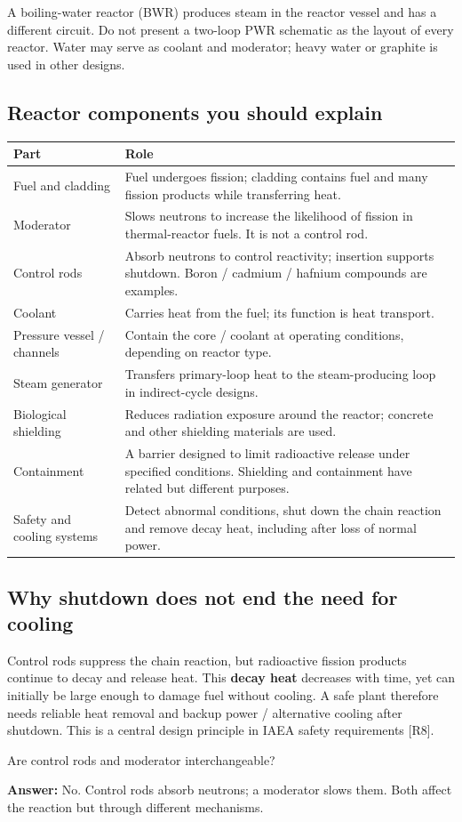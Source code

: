 \documentclass[11pt,a4paper]{article}
\newcommand{\checkq}[2]{\begin{tcolorbox}[breakable=false,colback=pale,colframe=teal,coltitle=white,title={Check your understanding}]#1\par\textbf{Answer:} #2\end{tcolorbox}}
\begin{document}
A boiling-water reactor (BWR) produces steam in the reactor vessel and has a different circuit. Do not present a two-loop PWR schematic as the layout of every reactor. Water may serve as coolant and moderator; heavy water or graphite is used in other designs.

\subsection{Reactor components you should explain}
\begin{center}\small
\begin{tabularx}{\textwidth}{L{3.4cm}Y}
\toprule\textbf{Part} & \textbf{Role}\\\midrule
Fuel and cladding & Fuel undergoes fission; cladding contains fuel and many fission products while transferring heat.\\
Moderator & Slows neutrons to increase the likelihood of fission in thermal-reactor fuels. It is not a control rod.\\
Control rods & Absorb neutrons to control reactivity; insertion supports shutdown. Boron / cadmium / hafnium compounds are examples.\\
Coolant & Carries heat from the fuel; its function is heat transport.\\
Pressure vessel / channels & Contain the core / coolant at operating conditions, depending on reactor type.\\
Steam generator & Transfers primary-loop heat to the steam-producing loop in indirect-cycle designs.\\
Biological shielding & Reduces radiation exposure around the reactor; concrete and other shielding materials are used.\\
Containment & A barrier designed to limit radioactive release under specified conditions. Shielding and containment have related but different purposes.\\
Safety and cooling systems & Detect abnormal conditions, shut down the chain reaction and remove decay heat, including after loss of normal power.\\\bottomrule
\end{tabularx}\end{center}

\subsection{Why shutdown does not end the need for cooling}
Control rods suppress the chain reaction, but radioactive fission products continue to decay and release heat. This \textbf{decay heat} decreases with time, yet can initially be large enough to damage fuel without cooling. A safe plant therefore needs reliable heat removal and backup power / alternative cooling after shutdown. This is a central design principle in IAEA safety requirements [R8].
\checkq{Are control rods and moderator interchangeable?}{No. Control rods absorb neutrons; a moderator slows them. Both affect the reaction but through different mechanisms.}
\end{document}
